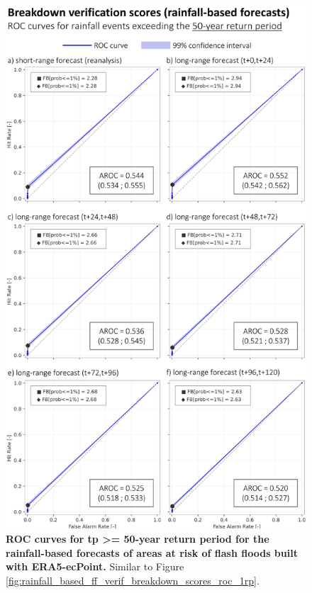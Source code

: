 \begin{figure}[htbp]
\centering
\includegraphics[width=\textwidth]{chapter_05/figures/rainfall_based_ff_verif_breakdown_scores_roc_50rp.png}
\caption{\textbf{ROC curves for tp >= 50-year return period for the rainfall-based forecasts of areas at risk of flash floods built with ERA5-ecPoint.} Similar to Figure \ref{fig:rainfall_based_ff_verif_breakdown_scores_roc_1rp}.}
\label{fig:rainfall_based_ff_verif_breakdown_scores_roc_50rp}
\end{figure}

